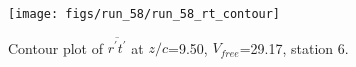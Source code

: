 \begin{figure}[H]
\centering
\texttt{[image: figs/run\_58/run\_58\_rt\_contour]}
\caption{Contour plot of $\overline{r^\prime t^\prime}$ at $z/c$=9.50, $V_{free}$=29.17, station 6.}
\end{figure}


